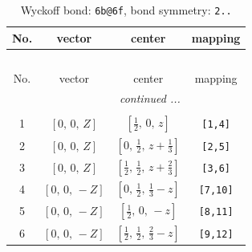 \documentclass[fleqn,8pt]{jsarticle}
\begin{document}
\begin{longtable}{cccc}
\caption{Wyckoff bond: {\tt 6b@6f}, bond symmetry: {\tt 2..}}
 \\
 \hline \hline
No. & vector & center & mapping \\ \hline \endfirsthead

\multicolumn{3}{l}{\tablename\ \thetable{}} \\
 \hline \hline
No. & vector & center & mapping \\ \hline \endhead

 \hline \hline
\multicolumn{3}{r}{\footnotesize\it continued ...} \\ \endfoot

 \hline \hline
\multicolumn{3}{r}{} \\ \endlastfoot

1 & $\left[ 0,\, 0,\, Z \right]$ & $\left[ \frac{1}{2},\, 0,\, z \right]$ & {\tt [1,4]} \\ \hline
2 & $\left[ 0,\, 0,\, Z \right]$ & $\left[ 0,\, \frac{1}{2},\, z + \frac{1}{3} \right]$ & {\tt [2,5]} \\ \hline
3 & $\left[ 0,\, 0,\, Z \right]$ & $\left[ \frac{1}{2},\, \frac{1}{2},\, z + \frac{2}{3} \right]$ & {\tt [3,6]} \\ \hline
4 & $\left[ 0,\, 0,\, - Z \right]$ & $\left[ 0,\, \frac{1}{2},\, \frac{1}{3} - z \right]$ & {\tt [7,10]} \\ \hline
5 & $\left[ 0,\, 0,\, - Z \right]$ & $\left[ \frac{1}{2},\, 0,\, - z \right]$ & {\tt [8,11]} \\ \hline
6 & $\left[ 0,\, 0,\, - Z \right]$ & $\left[ \frac{1}{2},\, \frac{1}{2},\, \frac{2}{3} - z \right]$ & {\tt [9,12]} \\
\end{longtable}
\renewcommand{\arraystretch}{1.2}
\end{document}
